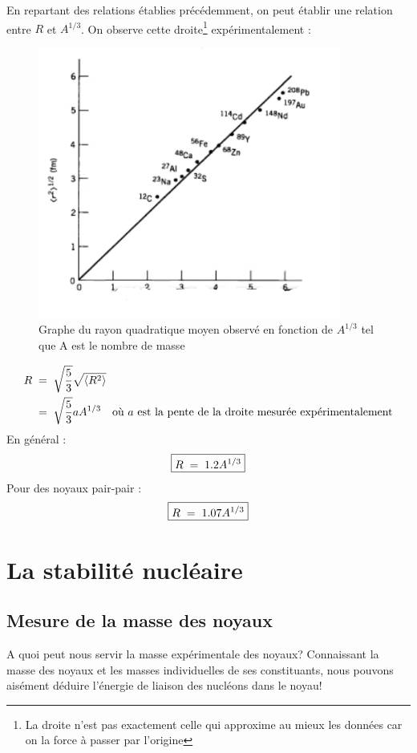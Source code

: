 En repartant des relations établies précédemment, on peut établir une relation entre $R$ et $A^{1/3}$. On observe cette droite\footnote{La droite n'est pas exactement celle qui approxime au mieux les données car on la force à passer par l'origine} expérimentalement :
\begin{figure}[H]
    \centering
    \includegraphics[scale=1.2]{Images4/DroiteAR.PNG}
    \caption{Graphe du rayon quadratique moyen observé en fonction de $A^{1/3}$ tel que A est le nombre de masse}
\end{figure}
\begin{align*}
    R &\; = \; \sqrt{\dfrac{5}{3}} \sqrt{\expval{R^2}}\\
    &\; = \; \sqrt{\dfrac{5}{3}} aA^{1/3} \quad \text{où $a$ est la pente de la droite mesurée expérimentalement}
\end{align*}
En général :
\[
    \boxed{
        R \; = \; 1.2 A^{1/3}
    }
\]
Pour des noyaux pair-pair :
\[
    \boxed{
        R \; = \; 1.07 A^{1/3}
    }
\]



\section{La stabilité nucléaire}

\subsection{Mesure de la masse des noyaux}

A quoi peut nous servir la masse expérimentale des noyaux? Connaissant la masse des noyaux et les masses individuelles de ses constituants, nous pouvons aisément déduire l'énergie de liaison des nucléons dans le noyau!

